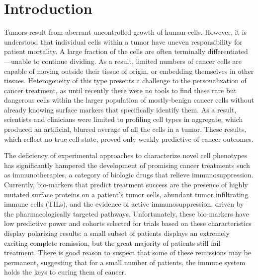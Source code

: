 
\chapter*{Introduction} %



Tumors result from aberrant uncontrolled growth of human cells. 
However, it is understood that individual cells within a tumor have uneven responsibility for patient mortality. 
A large fraction of the cells are often terminally differentiated---unable to continue dividing.
As a result, limited numbers of cancer cells are capable of moving outside their tissue of origin, or embedding themselves in other tissues.
Heterogeneity of this type presents a challenge to the personalization of cancer treatment, as until recently there were no tools to find these rare but dangerous cells within the larger population of mostly-benign cancer cells without already knowing surface markers that specifically identify them. 
As a result, scientists and clinicians were limited to profiling cell types in aggregate, which produced an artificial, blurred average of all the cells in a tumor. 
These results, which reflect no true cell state, proved only weakly predictive of cancer outcomes. %

The deficiency of experimental approaches to characterize novel cell phenotypes has significantly hampered the development of promising cancer treatments such as immunotherapies, a category of biologic drugs that relieve immunosuppression. 
Currently, bio-markers that predict treatment success are the presence of highly mutated surface proteins on a patient's tumor cells, abundant tumor infiltrating immune cells (TILs), and the evidence of active immunosuppression, driven by the pharmacologically targeted pathways.
Unfortunately, these bio-markers have low predictive power and cohorts selected for trials based on these characteristics display polarizing results: a small subset of patients displays an extremely exciting complete remission, but the great majority of patients still fail treatment.
There is good reason to suspect that some of these remissions may be permanent, suggesting that for a small number of patients, the immune system holds the keys to curing them of cancer. 

